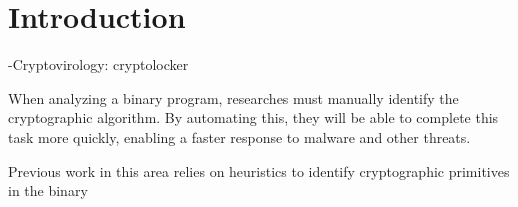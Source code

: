 \chapter{Introduction}

-Cryptovirology: cryptolocker

When analyzing a binary program, researches must manually identify the cryptographic algorithm.  By automating this, they will be able to complete this task more quickly, enabling a faster response to malware and other threats.

Previous work in this area relies on heuristics to identify cryptographic primitives in the binary